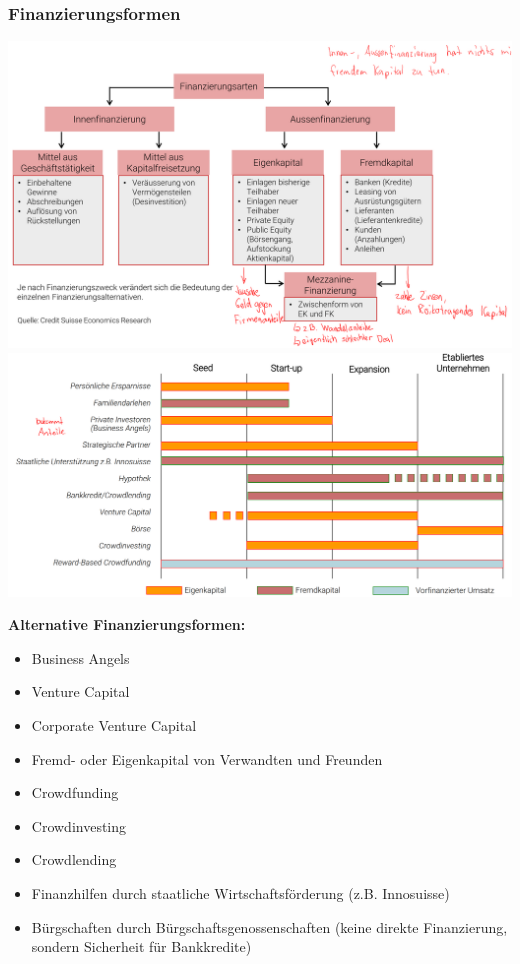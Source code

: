 \subsubsection{Finanzierungsformen}
\begin{multicols}{2}
	\includegraphics[width=1\linewidth]{images/finanzierungsformen}
	\includegraphics[width=1\linewidth]{images/finanzierungsformen_2}
\end{multicols}

\textbf{Alternative Finanzierungsformen:}
\begin{itemize}
	\item Business Angels
	\item Venture Capital
	\item Corporate Venture Capital
	\item Fremd- oder Eigenkapital von Verwandten und Freunden
	\item Crowdfunding
	\item Crowdinvesting
	\item Crowdlending
	\item Finanzhilfen durch staatliche Wirtschaftsförderung (z.B. Innosuisse)
	\item Bürgschaften durch Bürgschaftsgenossenschaften (keine direkte Finanzierung, sondern Sicherheit für Bankkredite)
\end{itemize}

